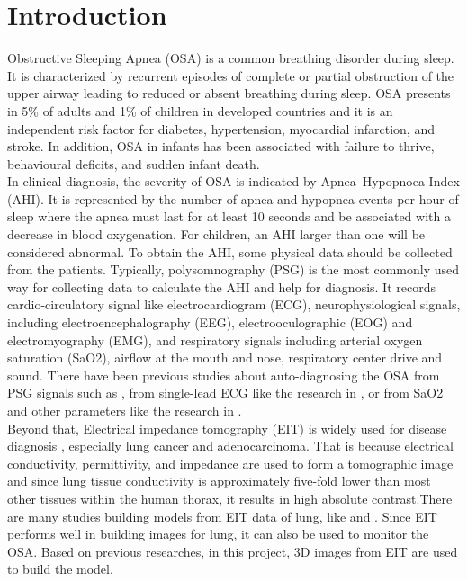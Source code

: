 \documentclass[ a4paper, 12pt, oneside ]{article} %
\begin{document}
\section{Introduction} %
\label{introduction} %
Obstructive Sleeping Apnea (OSA) is a common breathing disorder during sleep. It is characterized by recurrent episodes of complete or partial obstruction of the upper airway leading to reduced or absent breathing during sleep. OSA presents in 5\% of adults and 1\% of children in developed countries and it is an independent risk factor for diabetes, hypertension, myocardial infarction, and stroke. In addition, OSA in infants has been associated with failure to thrive, behavioural deficits, and sudden infant death.\cite{Katz2012}\\
In clinical diagnosis, the severity of OSA is indicated by Apnea–Hypopnoea Index (AHI). It is represented by the number of apnea and hypopnea events per hour of sleep where the apnea must last for at least 10 seconds and be associated with a decrease in blood oxygenation. For children, an AHI larger than one will be considered abnormal. 
To obtain the AHI, some physical data should be collected from the patients. Typically, polysomnography (PSG) is the most commonly used way for collecting data to calculate the AHI and help for diagnosis. It records cardio-circulatory signal like electrocardiogram (ECG),  neurophysiological signals, including electroencephalography (EEG),  electrooculographic (EOG) and electromyography (EMG), and respiratory signals including arterial oxygen saturation (SaO2), airflow at the mouth and nose, respiratory center drive and sound.\cite{Bloch1997} There have been previous studies about auto-diagnosing the OSA from PSG signals such as \cite{Song2016}, from single-lead ECG like the research in \cite{Feng2020}, or from SaO2 and other parameters like the research in \cite{Mencar2020}.\\
Beyond that, Electrical impedance tomography (EIT) is widely used for disease diagnosis \cite{Fonseca2016}, especially lung cancer and adenocarcinoma. That is because electrical conductivity, permittivity, and impedance are used to form a tomographic image and since lung tissue conductivity is approximately five-fold lower than most other tissues within the human thorax, it results in high absolute contrast.\cite{doi:10.1080/0309190021000059687}There are many studies building models from EIT data of lung, like \cite{prabu2016performance} and \cite{rymarczykimplementing}. Since EIT performs well in building images for lung, it can also be used to monitor the OSA. Based on previous researches, in this project, 3D images from EIT are used to build the model. \\
\end{document}
